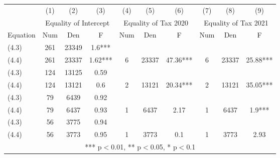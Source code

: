\begin{tabular}{lccccccccc} \hline
& (1) & (2) & (3) & (4) & (5) & (6)  & (7) & (8) & (9) \\
&\multicolumn{3}{c}{Equality of Intercept} &\multicolumn{3}{c}{Equality of Tax 2020} &\multicolumn{3}{c}{Equality of Tax 2021}\\
Equation&Num&Den&F&Num&Den&F&Num&Den&F\\
(4.3)&261&23349&1.6***\\
(4.4)&261&23337&1.62***&6&23337&47.36***&6&23337&25.88***\\
(4.3)&124&13125&0.59\\
(4.4)&124&13121&0.6&2&13121&20.34***&2&13121&35.05***\\
(4.3)&79&6439&0.92\\
(4.4)&79&6437&0.93&1&6437&2.17&1&6437&1.9***\\
(4.3)&56&3775&0.94\\
(4.4)&56&3773&0.95&1&3773&0.1&1&3773&2.93\\
\hline
\multicolumn{10}{c}{ *** p$<$0.01, ** p$<$0.05, * p$<$0.1} \\
\end{tabular}
